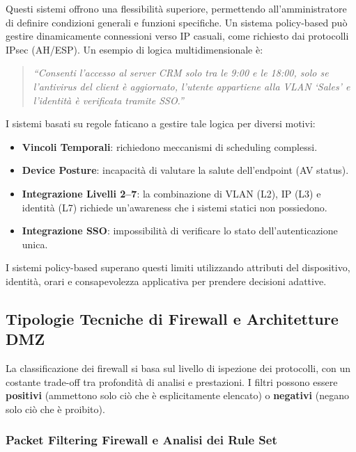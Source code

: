 Questi sistemi offrono una flessibilità superiore, permettendo all'amministratore di definire 
condizioni generali e funzioni specifiche. Un sistema policy-based può gestire dinamicamente 
connessioni verso IP casuali, come richiesto dai protocolli IPsec (AH/ESP). Un esempio di logica 
multidimensionale è:

\begin{quote}
\textit{``Consenti l'accesso al server CRM solo tra le 9:00 e le 18:00, solo se l'antivirus del 
client è aggiornato, l'utente appartiene alla VLAN `Sales' e l'identità è verificata tramite SSO.''}
\end{quote}

I sistemi basati su regole faticano a gestire tale logica per diversi motivi:

\begin{itemize}
    \item \textbf{Vincoli Temporali}: richiedono meccanismi di scheduling complessi.
    \item \textbf{Device Posture}: incapacità di valutare la salute dell'endpoint (AV status).
    \item \textbf{Integrazione Livelli 2--7}: la combinazione di VLAN (L2), IP (L3) e identità (L7) 
    richiede un'awareness che i sistemi statici non possiedono.
    \item \textbf{Integrazione SSO}: impossibilità di verificare lo stato dell'autenticazione unica.
\end{itemize}

I sistemi policy-based superano questi limiti utilizzando attributi del dispositivo, identità, 
orari e consapevolezza applicativa per prendere decisioni adattive.

\subsection{Tipologie Tecniche di Firewall e Architetture DMZ}

La classificazione dei firewall si basa sul livello di ispezione dei protocolli, con un costante 
trade-off tra profondità di analisi e prestazioni. I filtri possono essere \textbf{positivi} 
(ammettono solo ciò che è esplicitamente elencato) o \textbf{negativi} (negano solo ciò che è proibito).

\subsubsection{Packet Filtering Firewall e Analisi dei Rule Set}

